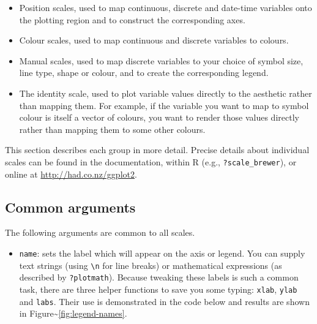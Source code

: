\begin{itemize}
\itemsep1pt\parskip0pt
\item
  Position scales, used to map continuous, discrete and date-time
  variables onto the plotting region and to construct the corresponding
  axes.
\item
  Colour scales, used to map continuous and discrete variables to
  colours.
\item
  Manual scales, used to map discrete variables to your choice of symbol
  size, line type, shape or colour, and to create the corresponding
  legend.
\item
  The identity scale, used to plot variable values directly to the
  aesthetic rather than mapping them. For example, if the variable you
  want to map to symbol colour is itself a vector of colours, you want
  to render those values directly rather than mapping them to some other
  colours.
\end{itemize}

\noindent  This section describes each group in more detail. Precise
details about individual scales can be found in the documentation,
within R (e.g., \texttt{?scale\_brewer}), or online at
\url{http://had.co.nz/ggplot2}.

\subsection{Common arguments}\label{sub:scale-arguments}

The following arguments are common to all scales.

\begin{itemize}
\itemsep1pt\parskip0pt
\item
  \texttt{name}: sets the label which will appear on the axis or legend.
  You can supply text strings (using \texttt{\textbackslash{}n} for line
  breaks) or mathematical expressions (as described by
  \texttt{?plotmath}). Because tweaking these labels is such a common
  task, there are three helper functions to save you some typing:
  \texttt{xlab}, \texttt{ylab} and \texttt{labs}. Their use is
  demonstrated in the code below and results are shown in
  Figure\textasciitilde{}\ref{fig:legend-names}. 
   
\end{itemize}

